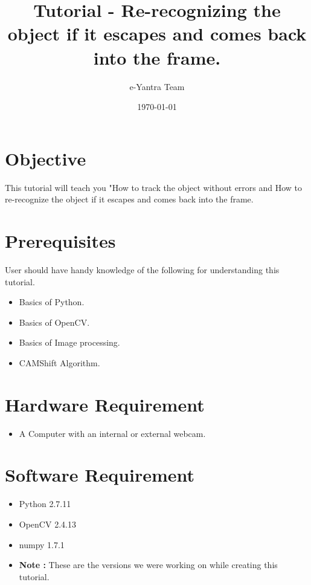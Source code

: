 \documentclass[11pt,a4paper]{article}
\title{Tutorial - Re-recognizing the object if it escapes and comes back into the frame.}
\author{e-Yantra Team}
\date{\today}
\begin{document}
	\maketitle
	\newpage
	\tableofcontents
	\newpage
	\section{Objective}
	This tutorial will teach you "How to track the object without errors and How to re-recognize the object if it escapes and comes back into the frame.
	\section{Prerequisites}
	User should have handy knowledge of the following for understanding this tutorial.
	\begin{itemize}
		\item Basics of Python.
		\item Basics of OpenCV.
		\item Basics of Image processing.
		\item CAMShift Algorithm.
	\end{itemize}
	\section{Hardware Requirement}
	\begin{itemize}
		\item A Computer with an internal or external webcam.
	\end{itemize}
	\section{Software Requirement}
	\begin{itemize}
		\item Python 2.7.11
		\item OpenCV 2.4.13 
		\item numpy 1.7.1
		\item \textbf{Note :} These are the versions we were working on while creating this tutorial.
	\end{itemize}
\end{document}
